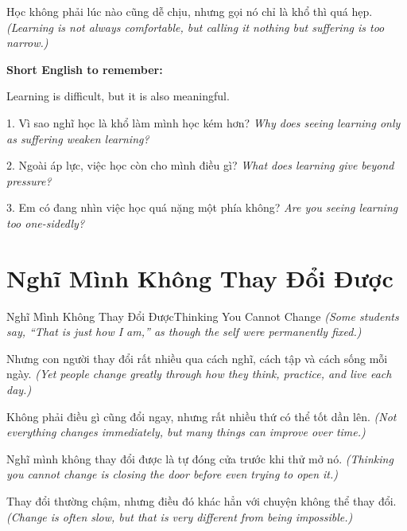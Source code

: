 \begin{baihoc}
Học không phải lúc nào cũng dễ chịu, nhưng gọi nó chỉ là khổ thì quá hẹp.
\textit{(Learning is not always comfortable, but calling it nothing but suffering is too narrow.)}
\end{baihoc}

\begin{ghinhoanh}
\textbf{Short English to remember:}

Learning is difficult, but it is also meaningful.

\end{ghinhoanh}

\begin{tuhocnhanh}
1. Vì sao nghĩ học là khổ làm mình học kém hơn? \textit{Why does seeing learning only as suffering weaken learning?}

2. Ngoài áp lực, việc học còn cho mình điều gì? \textit{What does learning give beyond pressure?}

3. Em có đang nhìn việc học quá nặng một phía không? \textit{Are you seeing learning too one-sidedly?}
\end{tuhocnhanh}
\ngancach

\section{Nghĩ Mình Không Thay Đổi Được}
\begin{truyen}{Nghĩ Mình Không Thay Đổi Được}{Thinking You Cannot Change}
\textit{(Some students say, “That is just how I am,” as though the self were permanently fixed.)}

Nhưng con người thay đổi rất nhiều qua cách nghĩ, cách tập và cách sống mỗi ngày.
\textit{(Yet people change greatly through how they think, practice, and live each day.)}

Không phải điều gì cũng đổi ngay, nhưng rất nhiều thứ có thể tốt dần lên.
\textit{(Not everything changes immediately, but many things can improve over time.)}

Nghĩ mình không thay đổi được là tự đóng cửa trước khi thử mở nó.
\textit{(Thinking you cannot change is closing the door before even trying to open it.)}
\end{truyen}

\begin{baihoc}
Thay đổi thường chậm, nhưng điều đó khác hẳn với chuyện không thể thay đổi.
\textit{(Change is often slow, but that is very different from being impossible.)}
\end{baihoc}

